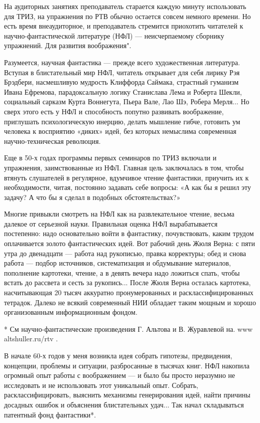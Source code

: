На   аудиторных  занятиях   преподаватель   старается  каждую   минуту
использовать для  ТРИЗ, на  упражнения по  РТВ обычно  остается совсем
немного  времени.   Но  есть  время  внеаудиторное,   и  преподаватель
стремится  приохотить  читателей  к  научно-фантастической  литературе
(НФЛ) — неисчерпаемому сборнику упражнений. Для развития воображения".

Разумеется,   научная  фантастика   —   прежде  всего   художественная
литература. Вступая  в блистательный  мир НФЛ, читатель  открывает для
себя  лирику Рэя  Брэдбери,  насмешливую  мудрость Клиффорда  Саймака,
страстный  гуманизм Ивана  Ефремова, парадоксальную  логику Станислава
Лема и Роберта Шекли, социальный  сарказм Курта Воннегута, Пьера Вале,
Лао  Шэ, Робера  Мерля...  Но сверх  этого есть  у  НФЛ и  способность
попутно  развивать  воображение, приглушать  психологическую  инерцию,
делать мышление гибче, готовить ум человека к восприятию «диких» идей,
без которых немыслима современная научно-техническая революция.

Еще  в  50-х годах  программы  первых  семинаров  по ТРИЗ  включали  и
упражнения,  заимствованные из  НФЛ. Главная  цель заключалась  в том,
чтобы втянуть  слушателей в  регулярное, вдумчивое  чтение фантастики,
приучить их  к необходимости, читая, постоянно  задавать себе вопросы:
«А  как  бы  я  решил  эту  задачу? А  что  бы  я  сделал  в  подобных
обстоятельствах?»

Многие привыкли смотреть на НФЛ  как на развлекательное чтение, весьма
далекое  от  серьезной  науки. Правильная  оценка  НФЛ  вырабатывается
постепенно: надо основательно войти в фантастику, почувствовать, каким
трудом оплачивается золото фантастических  идей. Вот рабочий день Жюля
Верна:  с пяти  утра  до  двенадцати —  работа  над рукописью,  правка
корректуры; обед и снова работа  — подбор источников, систематизация и
обдумывание  материалов,  пополнение  картотеки, чтение,  а  в  девять
вечера  надо ложиться  спать,  чтобы  встать до  рассвета  и сесть  за
рукопись...  После Жюля  Верна  осталась  картотека, насчитывающая  20
тысяч  аккуратно  пронумерованных  и  расклассифицированных  тетрадок.
Далеко  не  всякий современный  НИИ  обладает  таким мощным  и  хорошо
организованным информационным фондом.

* См научно-фантастические произведения Г. Альтова и В. Журавлевой на.
www altshuller.ru/rtv                                                .

В  начале   60-х  годов  у   меня  возникла  идея   собрать  гипотезы,
предвидения, концепции,  проблемы и  ситуации, разбросанные  в тысячах
книг. НФЛ  накопила огромный опыт  работы с  воображением — и  было бы
просто  неразумно не  исследовать  и не  использовать этот  уникальный
опыт. Собрать,  расклассифицировать, выяснить  механизмы генерирования
идей, найти причины досадных ошибок и объяснения блистательных удач...
Так начал складываться патентный фонд фантастики*.

